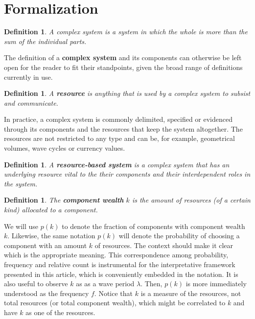 \documentclass[a4paper, 11pt]{article} %
\newtheorem{definition2}[theorem3]{Definition}
\begin{document}
\section{Formalization}\label{sec:form}

\begin{definition2}
A complex system is a system in which the whole is more
than the sum of the individual parts.
\end{definition2}

The definition of a {\bf complex system} and its components 
can otherwise be left open
for the reader to fit their standpoints,
given the broad range of definitions currently in use.

\begin{definition2}
	A {\bf resource} is anything that is used by a complex system to subsist and communicate.
\end{definition2}

In practice, a complex system is commonly delimited, specified or evidenced through its components and the resources that keep the system altogether.
The resources are not restricted to any type
and can be, for example, geometrical volumes,
wave cycles or currency values.

\begin{definition2}
	A {\bf resource-based system} is a complex system that has an underlying resource vital to the their components and their interdependent roles in the system.
\end{definition2}


\begin{definition2}
	The {\bf component wealth} $k$ is the amount of resources (of a certain kind) allocated to a component.
\end{definition2}

We will use $p(k)$ to denote the fraction of components with component wealth $k$.
Likewise, the same notation $p(k)$ will denote the probability of choosing a component with an amount $k$ of resources.
The context should make it clear which is the appropriate meaning.
This correspondence among probability, frequency and relative count is
instrumental for the interpretative framework presented in this article,
which is conveniently embedded in the notation.
It is also useful to observe 
$k$ as as a wave period $\lambda$.
Then, $p(k)$ is more immediately understood as 
the frequency $f$.
Notice that $k$ is a measure of the resources,
not total resources (or total component wealth), which
might be correlated to $k$ and have $k$ as one of the resources.
\end{document}
